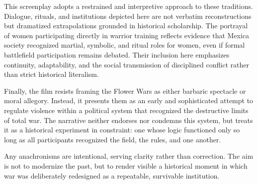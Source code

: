 \documentclass[12pt]{article}
\begin{document}
This screenplay adopts a restrained and interpretive approach to these traditions. Dialogue, rituals, and institutions depicted here are not verbatim reconstructions but dramatized extrapolations grounded in historical scholarship. The portrayal of women participating directly in warrior training reflects evidence that Mexica society recognized martial, symbolic, and ritual roles for women, even if formal battlefield participation remains debated. Their inclusion here emphasizes continuity, adaptability, and the social transmission of disciplined conflict rather than strict historical literalism.

Finally, the film resists framing the Flower Wars as either barbaric spectacle or moral allegory. Instead, it presents them as an early and sophisticated attempt to regulate violence within a political system that recognized the destructive limits of total war. The narrative neither endorses nor condemns this system, but treats it as a historical experiment in constraint: one whose logic functioned only so long as all participants recognized the field, the rules, and one another.

Any anachronisms are intentional, serving clarity rather than correction. The aim is not to modernize the past, but to render visible a historical moment in which war was deliberately redesigned as a repeatable, survivable institution.
\end{document}
